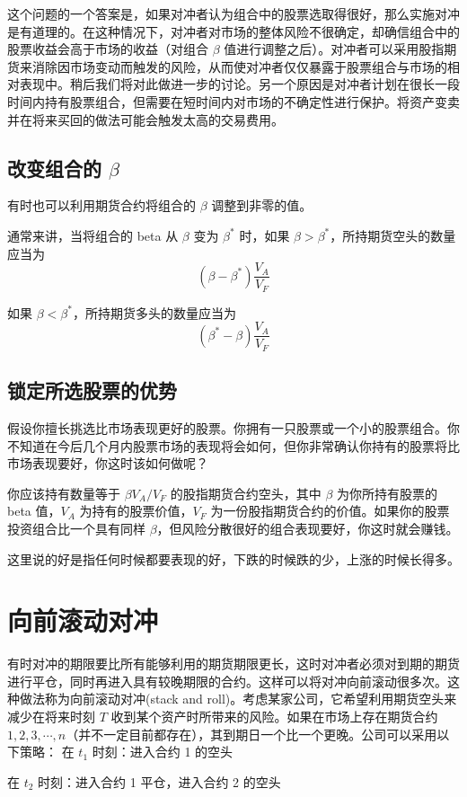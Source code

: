 这个问题的一个答案是，如果对冲者认为组合中的股票选取得很好，那么实施对冲是有道理的。在这种情况下，对冲者对市场的整体风险不很确定，却确信组合中的股票收益会高于市场的收益（对组合 $\beta$ 值进行调整之后）。对冲者可以采用股指期货来消除因市场变动而触发的风险，从而使对冲者仅仅暴露于股票组合与市场的相对表现中。稍后我们将对此做进一步的讨论。另一个原因是对冲者计划在很长一段时间内持有股票组合，但需要在短时间内对市场的不确定性进行保护。将资产变卖并在将来买回的做法可能会触发太高的交易费用。
\subsection{改变组合的 $\beta$}
有时也可以利用期货合约将组合的 $\beta$ 调整到非零的值。

通常来讲，当将组合的 beta 从 $\beta$ 变为 $\beta^*$ 时，如果
$\beta > \beta^*$，所持期货空头的数量应当为
$$(\beta-\beta^*)\frac{V_A}{V_F}$$

如果 $\beta < \beta^*$，所持期货多头的数量应当为
$$(\beta^*-\beta)\frac{V_A}{V_F}$$
\subsection{锁定所选股票的优势}
假设你擅长挑选比市场表现更好的股票。你拥有一只股票或一个小的股票组合。你不知道在今后几个月内股票市场的表现将会如何，但你非常确认你持有的股票将比市场表现要好，你这时该如何做呢？

你应该持有数量等于 $\beta V_A/V_F$ 的股指期货合约空头，其中 $\beta$ 为你所持有股票的 beta 值，$V_A$ 为持有的股票价值，$V_F$ 为一份股指期货合约的价值。如果你的股票投资组合比一个具有同样 $\beta$，但风险分散很好的组合表现要好，你这时就会赚钱。

\begin{tcolorbox}
    这里说的好是指任何时候都要表现的好，下跌的时候跌的少，上涨的时候长得多。
\end{tcolorbox}
\section{向前滚动对冲}
有时对冲的期限要比所有能够利用的期货期限更长，这时对冲者必须对到期的期货进行平仓，同时再进入具有较晚期限的合约。这样可以将对冲向前滚动很多次。这种做法称为向前滚动对冲(stack and roll)。考虑某家公司，它希望利用期货空头来减少在将来时刻 $T$ 收到某个资产时所带来的风险。如果在市场上存在期货合约 $1,2,3,\cdots,n$（并不一定目前都存在），其到期日一个比一个更晚。公司可以采用以下策略：
在 $t_1$ 时刻：进入合约 1 的空头

在 $t_2$ 时刻：进入合约 1 平仓，进入合约 2 的空头

